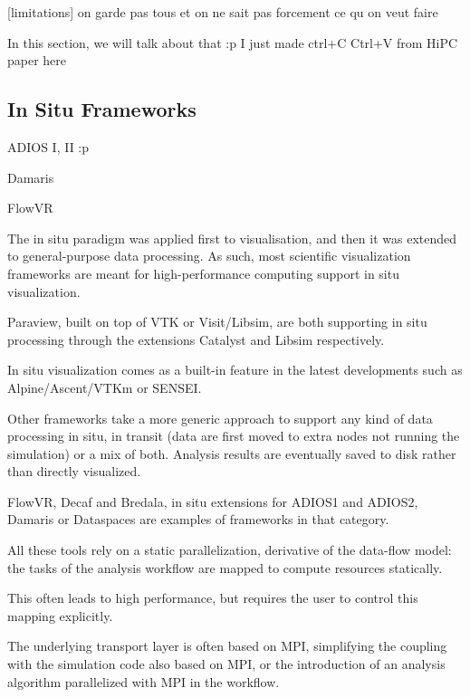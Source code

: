 [limitations] on garde pas tous et on ne sait pas forcement ce qu on veut faire 


In this section, we will talk about that :p
I just made ctrl+C Ctrl+V from HiPC paper here 
\subsection{In Situ Frameworks}

ADIOS I, II :p 

Damaris 

FlowVR

The in situ paradigm was applied first to visualisation\cite{InSituLiuMa:2007}, and then it was extended to general-purpose data processing. As such, most scientific visualization frameworks are meant for high-performance computing support in situ visualization.

Paraview\cite{ahrens_paraview_2005}, built on top of VTK\cite{hanwell_visualization_2015_vtk} or Visit/Libsim\cite{childs_visit_nodate}, are both supporting in situ processing through the extensions Catalyst\cite{catalyst11} and Libsim\cite{libsim11} respectively.

In situ visualization comes as a built-in feature in the latest developments such as Alpine/Ascent/VTKm\cite{Larsen-alpine-isav17,moreland_vtk-m_2016} or SENSEI\cite{ayachit_sensei_2016}.

Other frameworks take a more generic approach to support any kind of data processing in situ, in transit (data are first moved to extra nodes not running the simulation) or a mix of both.
Analysis results are eventually saved to disk rather than directly visualized.

FlowVR\cite{dreher_flexible_2014}, 
Decaf\cite{dreher_decaf_2017} and Bredala\cite{dreher_bredala_2016}, 
in situ extensions for ADIOS1\cite{lofstead_insights_2013_adios,boyuka_transparent_2014_adios} and ADIOS2\cite{godoy_adios2_2020}, Damaris\cite{dorier_damaris_2012} or 
Dataspaces\cite{docan_dataspaces_2012} are examples of frameworks in that category.

All these tools rely on a static parallelization, derivative of the data-flow model: the tasks of the analysis workflow are mapped to compute resources statically.

This often leads to high performance, but requires the user to control this mapping explicitly.

The underlying transport layer is often based on MPI, simplifying the coupling with the simulation code also based on MPI, or the introduction of an analysis algorithm parallelized with MPI in the workflow.


